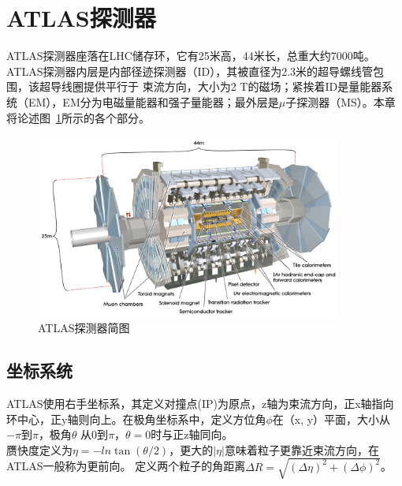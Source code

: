 \section{ATLAS探测器} \label{sec:ATLAS}
ATLAS探测器座落在LHC储存环，它有25米高，44米长，总重大约7000吨。ATLAS探测器内层是内部径迹探测器（ID），其被直径为2.3米的超导螺线管包围，该超导线圈提供平行于
束流方向，大小为2 T的磁场；紧挨着ID是量能器系统（EM），EM分为电磁量能器和强子量能器；最外层是$\mu$子探测器（MS）。本章将论述图~\ref{fig:ATLAS_schematic}所示的各个部分。

\begin{figure}[h]
\begin{center}
\includegraphics[width=0.9\textwidth]{fig/ATLAS_SE_Corrected7.pdf}
\caption{ATLAS探测器简图} \label{fig:ATLAS_schematic}
\end{center}
\end{figure}

\subsection{坐标系统}
ATLAS使用右手坐标系，其定义对撞点(IP)为原点，z轴为束流方向，正x轴指向环中心，正y轴则向上。在极角坐标系中，定义方位角$\phi$在（x, y）平面，大小从$-\pi$到$\pi$，极角$\theta$
从0到$\pi$，$\theta=0$时与正z轴同向。\\
赝快度定义为$\eta = -ln\tan(\theta/2)$，更大的$|\eta|$意味着粒子更靠近束流方向，在ATLAS一般称为更前向。
定义两个粒子的角距离$\Delta R=\sqrt{(\Delta\eta)^2+(\Delta\phi)^2}$。

